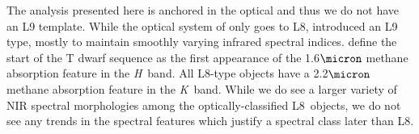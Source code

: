 \documentclass[modern]{aastex61}
\begin{document}
The analysis presented here is anchored in the optical and thus we do not have an L9 template.
While the optical system of \cite{K99} only goes to L8, \cite{Geballe02} introduced an L9 type, mostly to maintain smoothly varying infrared spectral indices.
\cite{Geballe02} define the start of the T dwarf sequence as the first appearance of the 1.6$\micron$ methane absorption feature in the \emph{H}~band.
All L8-type objects have a 2.2$\micron$ methane absorption feature in the \emph{K}~band.
While we do see a larger variety of NIR spectral morphologies among the optically-classified L8~objects, we do not see any trends in the spectral features which justify a spectral class later than L8.
\end{document}
